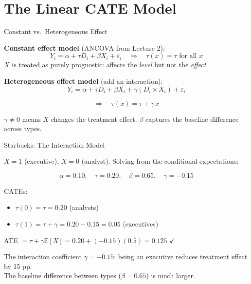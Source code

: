 \documentclass[aspectratio=169, 11pt]{beamer}
\newcommand{\E}{\mathbb{E}}
\begin{document}
 
\section{The Linear CATE Model}
 
\begin{frame}{Constant vs.\ Heterogeneous Effect}
 
\textbf{Constant effect model} (ANCOVA from Lecture 2):
\[
Y_i = \alpha + \tau D_i + \beta X_i + \varepsilon_i \quad \Longrightarrow \quad \tau(x) = \tau \text{ for all } x
\]
$X$ is treated as purely prognostic: affects the \emph{level} but not the \emph{effect}.
 
\bigskip
\pause
 
\textbf{Heterogeneous effect model} (add an interaction):
\[
Y_i = \alpha + \tau D_i + \beta X_i + \gamma (D_i \times X_i) + \varepsilon_i
\]
 
\[
\Longrightarrow \quad \tau(x) = \tau + \gamma \, x
\]
 
\bigskip
 
$\gamma \neq 0$ means $X$ changes the treatment effect. $\beta$ captures the baseline difference across types.
\end{frame}
 
\begin{frame}{Starbucks: The Interaction Model}
 
$X = 1$ (executive), $X = 0$ (analyst). Solving from the conditional expectations:
 
\[
\alpha = 0.10, \quad \tau = 0.20, \quad \beta = 0.65, \quad \gamma = -0.15
\]
 
\bigskip
 
CATEs:
\begin{itemize}
    \item $\tau(0) = \tau = 0.20$ (analysts)
    \item $\tau(1) = \tau + \gamma = 0.20 - 0.15 = 0.05$ (executives)
\end{itemize}
 
\bigskip
 
ATE $= \tau + \gamma \E[X] = 0.20 + (-0.15)(0.5) = 0.125$ $\checkmark$ 
 
\bigskip
 
The interaction coefficient $\gamma = -0.15$: being an executive reduces treatment effect by 15 pp. \\
The baseline difference between types ($\beta = 0.65$) is much larger.
\end{frame}
 
\end{document}
